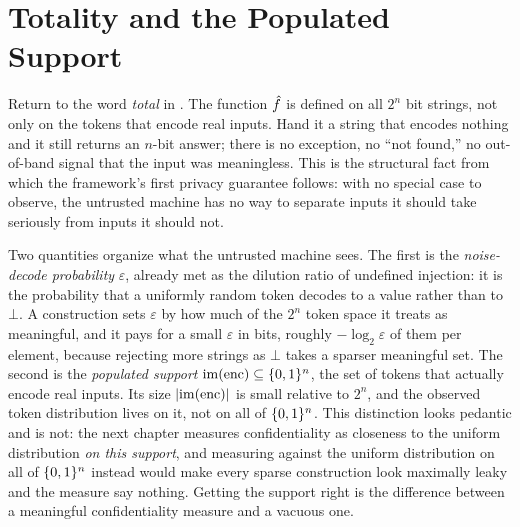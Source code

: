 \section{Totality and the Populated Support}
\label{sec:totality-support}

Return to the word \emph{total} in . The function
$\hat{f}$ is defined on all $2^n$ bit strings, not only on the tokens that
encode real inputs. Hand it a string that encodes nothing and it still
returns an $n$-bit answer; there is no exception, no ``not found,'' no
out-of-band signal that the input was meaningless. This is the structural
fact from which the framework's first privacy guarantee follows: with no
special case to observe, the untrusted machine has no way to separate
inputs it should take seriously from inputs it should not.

Two quantities organize what the untrusted machine sees. The first is the
\emph{noise-decode probability} $\varepsilon$, already met as the dilution
ratio of undefined injection: it is the probability that a uniformly random
token decodes to a value rather than to $\bot$. A construction sets
$\varepsilon$ by how much of the $2^n$ token space it treats as meaningful,
and it pays for a small $\varepsilon$ in bits, roughly $-\log_2 \varepsilon$
of them per element, because rejecting more strings as $\bot$ takes a
sparser meaningful set. The second is the \emph{populated support}
$\mathrm{im}(\operatorname{enc}) \subseteq \{0,1\}^n$, the set of tokens that actually encode
real inputs. Its size $\lvert \mathrm{im}(\operatorname{enc}) \rvert$ is small relative to
$2^n$, and the observed token distribution lives on it, not on all of
$\{0,1\}^n$. This distinction looks pedantic and is not: the next chapter
measures confidentiality as closeness to the uniform distribution \emph{on
this support}, and measuring against the uniform distribution on all of
$\{0,1\}^n$ instead would make every sparse construction look maximally leaky and
the measure say nothing. Getting the support right is the difference between
a meaningful confidentiality measure and a vacuous one.

